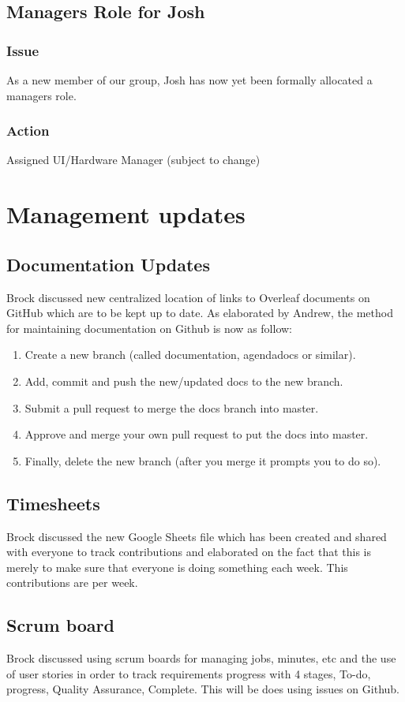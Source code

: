 \documentclass{article}
\begin{document}
     \subsection{Managers Role for Josh}
		\subsubsection*{Issue}
		As a new member of our group, Josh has now yet been formally allocated a managers role.
    	\subsubsection*{Action}
    	Assigned UI/Hardware Manager (subject to change)
\section{Management updates}
	\subsection{Documentation Updates}
    Brock discussed new centralized location of links to Overleaf documents on GitHub which are to be kept up to date. As elaborated by Andrew, the method for maintaining documentation on Github is now as follow:
   \begin{enumerate}
   	\item Create a new branch (called documentation, agendadocs or similar).
   	\item Add, commit and push the new/updated docs to the new branch.
   	\item Submit a pull request to merge the docs branch into master.
   	\item Approve and merge your own pull request to put the docs into master.
   	\item Finally, delete the new branch (after you merge it prompts you to do so).
   \end{enumerate}
   
	\subsection{Timesheets}
	Brock discussed the new Google Sheets file which has been created and shared with everyone to track contributions and elaborated on the fact that this is merely to make sure that everyone is doing something each week. This contributions are per week.

    \subsection{Scrum board}
Brock discussed using scrum boards for managing jobs, minutes, etc and the use of user stories in order to track requirements progress with 4 stages, To-do, progress, Quality Assurance, Complete. This will be does using issues on Github.\newline 
\end{document}
